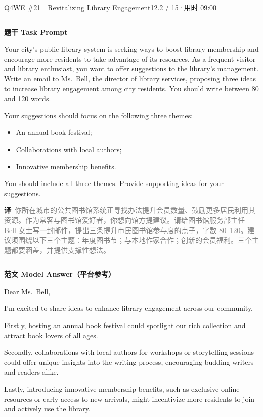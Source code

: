 \documentclass[11pt]{article}
\newcommand{\ptesub}[1]{%
  \par\needspace{2\baselineskip}\smallskip
  {\color{cAccent}\rule[-0.2ex]{3pt}{1.05em}}\hspace{6pt}%
  {\bfseries\color{cHead}#1}\par\nopagebreak\smallskip}
\newcommand{\zh}[1]{{\footnotesize\textcolor{cNote}{\textbf{译}}\ \textcolor{gray}{#1}}}
\begin{document}
\begin{qblock}{Q4\quad WE \#21\ \ Revitalizing Library Engagement}{12.2 / 15\quad·\quad 用时 09:00}

\ptesub{题干 Task Prompt}
\begin{promptbox}
Your city's public library system is seeking ways to boost library membership and encourage more residents to take advantage of its resources. As a frequent visitor and library enthusiast, you want to offer suggestions to the library's management. Write an email to Ms.\ Bell, the director of library services, proposing three ideas to increase library engagement among city residents. You should write between 80 and 120 words.

\smallskip Your suggestions should focus on the following three themes:
\begin{itemize}[leftmargin=1.4em,topsep=2pt,itemsep=0pt]
  \item An annual book festival;
  \item Collaborations with local authors;
  \item Innovative membership benefits.
\end{itemize}
You should include all three themes. Provide supporting ideas for your suggestions.
\end{promptbox}
\zh{你所在城市的公共图书馆系统正寻找办法提升会员数量、鼓励更多居民利用其资源。作为常客与图书馆爱好者，你想向馆方提建议。请给图书馆服务部主任 Bell 女士写一封邮件，提出三条提升市民图书馆参与度的点子，字数 80–120。建议须围绕以下三个主题：年度图书节；与本地作家合作；创新的会员福利。三个主题都要涵盖，并提供支撑性想法。}

\ptesub{范文 Model Answer（平台参考）}
\begin{modelbox}
Dear Ms.\ Bell,

I'm excited to share ideas to enhance library engagement across our community.

Firstly, hosting an annual book festival could spotlight our rich collection and attract book lovers of all ages.

Secondly, collaborations with local authors for workshops or storytelling sessions could offer unique insights into the writing process, encouraging budding writers and readers alike.

Lastly, introducing innovative membership benefits, such as exclusive online resources or early access to new arrivals, might incentivize more residents to join and actively use the library.


\end{modelbox}
\end{qblock}
\end{document}
